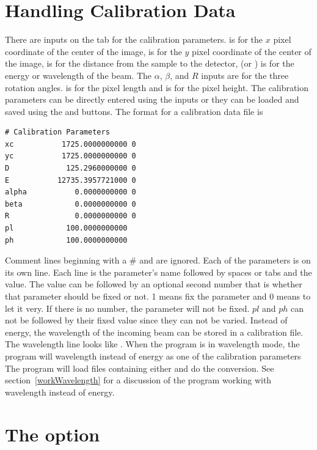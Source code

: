 \section{Handling Calibration Data}

There are inputs on the  tab 
for the calibration parameters.
 is for the $x$ pixel coordinate of the center of
the image,  is for the $y$ pixel coordinate of
the center of the image,  is for the distance from
the sample to the detector,
 (or \gui{$\lambda$:}) is for the energy
or wavelength of the beam. The $\alpha$, $\beta$, and
$R$ inputs are for the three rotation angles. 
 is for the pixel length
and  is for the pixel height.
The calibration parameters can be directly entered
using the inputs or they can be loaded and saved 
using the  and  
buttons. The format for a calibration data file is 
\begin{lstlisting}
# Calibration Parameters
xc           1725.0000000000 0
yc           1725.0000000000 0
D             125.2960000000 0
E           12735.3957721000 0
alpha           0.0000000000 0
beta            0.0000000000 0
R               0.0000000000 0
pl            100.0000000000
ph            100.0000000000
\end{lstlisting}
Comment lines beginning with
a \# and are ignored. Each of the parameters
is on its own line. Each line is the parameter's 
name followed by spaces or tabs and the
value. The value can be followed by an optional
second number that is whether that parameter
should be fixed or not. 1 means fix the parameter and 0 
means to let it very. If there is no number, the parameter will
not be fixed. $pl$ and $ph$ can not be followed by their fixed value
since they can not be varied.
Instead of energy, the wavelength of the incoming
beam can be stored in a calibration file.
The wavelength line looks like 
.
When the program is in wavelength mode, the program
will wavelength instead of energy as one of the calibration parameters 
The program will load files containing either and do the 
conversion. See section~\ref{workWavelength} for a discussion
of the program working with wavelength instead of energy.

\section{The \texorpdfstring{}
        {``Select The Center''} option}


